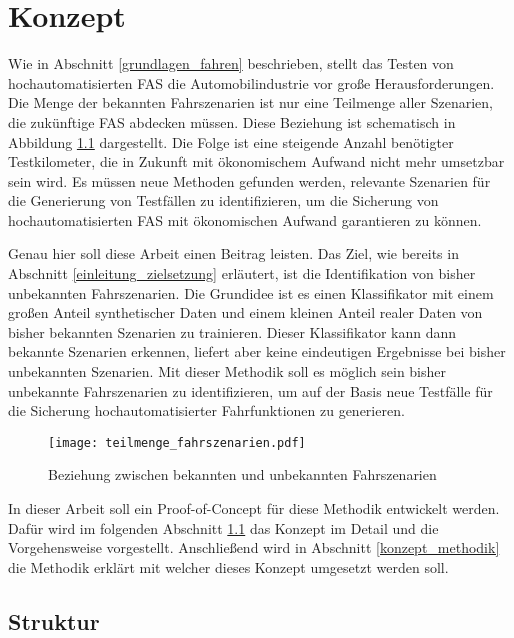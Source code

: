 
\chapter{Konzept}
\label{konzept}

Wie in Abschnitt \ref{grundlagen_fahren} beschrieben, stellt das Testen von hochautomatisierten \ac{FAS} die Automobilindustrie vor große Herausforderungen. Die Menge der bekannten Fahrszenarien ist nur eine Teilmenge aller Szenarien, die zukünftige \ac{FAS} abdecken müssen. Diese Beziehung ist schematisch in Abbildung \ref{fig_teilmenge_fahrszenarien} dargestellt. Die Folge ist eine steigende Anzahl benötigter Testkilometer, die in Zukunft mit ökonomischem Aufwand nicht mehr umsetzbar sein wird. Es müssen neue Methoden gefunden werden, relevante Szenarien für die Generierung von Testfällen zu identifizieren, um die Sicherung von hochautomatisierten \ac{FAS} mit ökonomischen Aufwand garantieren zu können.

Genau hier soll diese Arbeit einen Beitrag leisten. Das Ziel, wie bereits in Abschnitt \ref{einleitung_zielsetzung} erläutert, ist die Identifikation von bisher unbekannten Fahrszenarien. Die Grundidee ist es einen Klassifikator mit einem großen Anteil synthetischer Daten und einem kleinen Anteil realer Daten von bisher bekannten Szenarien zu trainieren. Dieser Klassifikator kann dann bekannte Szenarien erkennen, liefert aber keine eindeutigen Ergebnisse bei bisher unbekannten Szenarien. Mit dieser Methodik soll es möglich sein bisher unbekannte Fahrszenarien zu identifizieren, um auf der Basis neue Testfälle für die Sicherung hochautomatisierter Fahrfunktionen zu generieren.

\begin{figure}[h]
\centering
\texttt{[image: teilmenge\_fahrszenarien.pdf]}
\caption{Beziehung zwischen bekannten und unbekannten Fahrszenarien}
\label{fig_teilmenge_fahrszenarien}
\end{figure}

In dieser Arbeit soll ein Proof-of-Concept für diese Methodik entwickelt werden. Dafür wird im folgenden Abschnitt \ref{konzept_struktur} das Konzept im Detail und die Vorgehensweise vorgestellt. Anschließend wird in Abschnitt \ref{konzept_methodik} die Methodik erklärt mit welcher dieses Konzept umgesetzt werden soll.


\section{Struktur}
\label{konzept_struktur}

